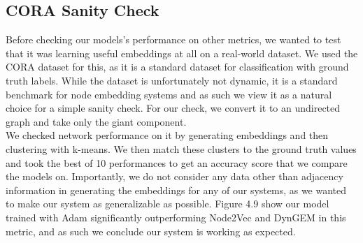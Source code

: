 \documentclass[12pt,twoside]{report}
\begin{document}
\subsection{CORA Sanity Check}

Before checking our models's performance on other metrics, we wanted to test that it was learning useful embeddings at all on a real-world dataset. We used the CORA dataset \cite{sen2008collective} for this, as it is a standard dataset for classification with ground truth labels. While the dataset is unfortunately not dynamic, it is a standard benchmark for node embedding systems and as such we view it as a natural choice for a simple sanity check. For our check, we convert it to an undirected graph and take only the giant component. \\

We checked network performance on it by generating embeddings and then clustering with k-means. We then match these clusters to the ground truth values and took the best of 10 performances to get an accuracy score that we compare the models on. Importantly, we do not consider any data other than adjacency information in generating the embeddings for any of our systems, as we wanted to make our system as generalizable as possible. Figure 4.9 show our model trained with Adam significantly outperforming Node2Vec and DynGEM in this metric, and as such we conclude our system is working as expected. \\
\end{document}
